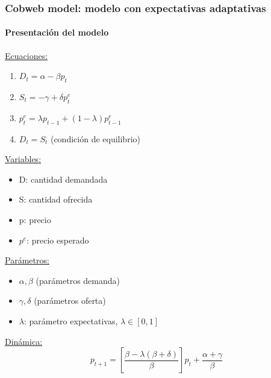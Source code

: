 \documentclass[11pt]{beamer}
\begin{document}
\begin{frame}
	\frametitle{Cobweb model: modelo con expectativas adaptativas}
	\framesubtitle{Presentación del modelo}
	\begin{multicols}{2}
		\underline{Ecuaciones:}
		\begin{enumerate}
			\item $D_t=\alpha-\beta p_t$
			\item $S_t=-\gamma+\delta p^{e}_{t}$
			\item $p^{e}_{t}=\lambda p_{t-1}+(1-\lambda) p^{e}_{t-1}$
			\item $D_t=S_t$ (condición de equilibrio)
		\end{enumerate}
		\underline{Variables:}
		\begin{itemize}
			\item D: cantidad demandada
			\item S: cantidad ofrecida
			\item p: precio
			\item $p^{e}$: precio esperado
		\end{itemize}
		\vspace{1cm}
		\underline{Parámetros: }
		\begin{itemize}
			\item $\alpha, \beta$ (parámetros demanda)
			\item $\gamma, \delta$ (parámetros oferta)
			\item $\lambda$: parámetro expectativas, $\lambda \in [0,1]$
		\end{itemize}
		\underline{Dinámica:}
		\begin{equation}
		p_{t+1}=\left[ \dfrac{\beta-\lambda(\beta+\delta)}{\beta}\right] p_t+\dfrac{\alpha+\gamma}{\beta}
		\end{equation}	
	\end{multicols}
\end{frame}
\end{document}
